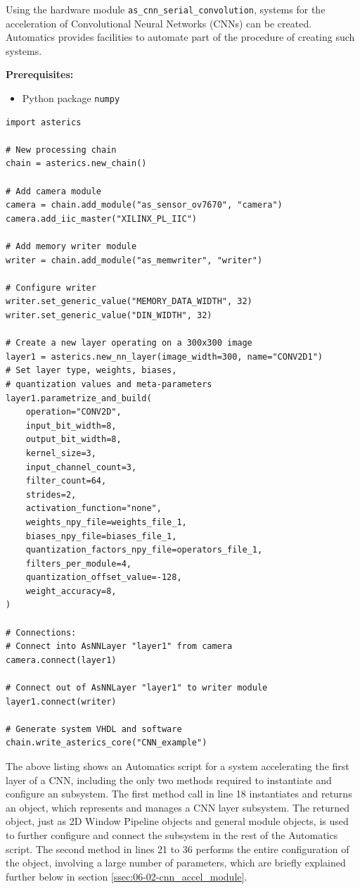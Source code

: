 Using the hardware module \texttt{as\_cnn\_serial\_convolution}, \asterics systems for the acceleration of Convolutional Neural Networks (CNNs) can be created.
Automatics provides facilities to automate part of the procedure of creating such systems.

\textbf{Prerequisites:}
\begin{itemize}
\item Python package \texttt{numpy}
\end{itemize}

\begin{lstlisting}[style=AutomaticsPython, caption=Example script CNN accelerator system.]
import asterics

# New processing chain
chain = asterics.new_chain()

# Add camera module
camera = chain.add_module("as_sensor_ov7670", "camera")
camera.add_iic_master("XILINX_PL_IIC")

# Add memory writer module
writer = chain.add_module("as_memwriter", "writer")

# Configure writer
writer.set_generic_value("MEMORY_DATA_WIDTH", 32)
writer.set_generic_value("DIN_WIDTH", 32)

# Create a new layer operating on a 300x300 image
layer1 = asterics.new_nn_layer(image_width=300, name="CONV2D1")
# Set layer type, weights, biases, 
# quantization values and meta-parameters
layer1.parametrize_and_build(
    operation="CONV2D",
    input_bit_width=8,
    output_bit_width=8,
    kernel_size=3,
    input_channel_count=3,
    filter_count=64,
    strides=2,
    activation_function="none",
    weights_npy_file=weights_file_1,
    biases_npy_file=biases_file_1,
    quantization_factors_npy_file=operators_file_1,
    filters_per_module=4,
    quantization_offset_value=-128,
    weight_accuracy=8,
)

# Connections:
# Connect into AsNNLayer "layer1" from camera
camera.connect(layer1)

# Connect out of AsNNLayer "layer1" to writer module
layer1.connect(writer)

# Generate system VHDL and software
chain.write_asterics_core("CNN_example")
\end{lstlisting}

The above listing shows an Automatics script for a system accelerating the first layer of a CNN, including the only two methods required to instantiate and configure an  subsystem.
The first method call  in line 18 instantiates and returns an  object, which represents and manages a CNN layer subsystem.
The returned object, just as 2D Window Pipeline objects and general \asterics module objects, is used to further configure and connect the  subsystem in the rest of the Automatics script.
The second method  in lines 21 to 36 performs the entire configuration of the  object, involving a large number of parameters, which are briefly explained further below in section \ref{ssec:06-02-cnn_accel_module}.

